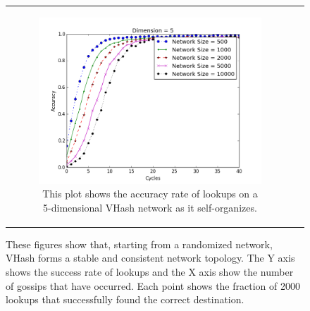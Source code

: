 \documentclass[10pt, conference, letterpaper]{IEEEtran}
\begin{document}
\begin{figure}
\begin{tabular}{cc}
\begin{subfigure}{\columnwidth}
        \includegraphics[width=\linewidth]{conv_d5}
                \caption{This plot shows the accuracy rate of lookups on a 5-dimensional VHash network as it self-organizes.}
        \label{conv5}
\end{subfigure}

\end{tabular}

\caption{These figures show that, starting from a randomized network, VHash forms a stable and consistent network topology.
The Y axis shows the success rate of lookups and the X axis show the number of gossips that have occurred.
Each point shows the fraction of 2000 lookups that successfully found the correct destination.}

\end{figure}
\end{document}
